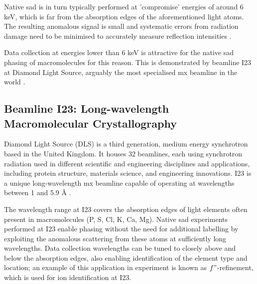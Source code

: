 Native \ac{sad} is in turn typically performed at 'compromise' energies of around 6 \unit{keV}, which is far from the absorption edges of the aforementioned light atoms. The resulting anomalous signal is small and systematic errors from radiation damage need to be minimised to accurately measure reflection intensities \cite{DjinovicCarugo2005}.%

Data collection at energies lower than 6 \unit{keV} is attractive for the native \ac{sad} phasing of macromolecules for this reason. This is demonstrated %
by beamline I23 at Diamond Light Source, arguably the most specialised \ac{mx} beamline in the world \cite{Foerster2019}. %

\subsection{Beamline I23: Long-wavelength Macromolecular Crystallography}

Diamond Light Source (DLS) is a third generation, medium energy synchrotron based in the United Kingdom. It houses 32 beamlines, each using synchrotron radiation used in different scientific and engineering disciplines and applications, including protein structure, materials science, and engineering innovations.
I23 is a unique long-wavelength \ac{mx} beamline capable of operating at wavelengths between 1 and 5.9 Å \cite{Wagner2016}.

The wavelength range at I23 covers the absorption edges of
light elements often present in macromolecules (P, S, Cl, K, Ca, Mg).
Native \ac{sad} experiments performed at I23 enable phasing without the need for additional labelling by exploiting the anomalous scattering from these atoms at sufficiently long wavelengths.
Data collection wavelengths can be tuned to closely above and below the absorption edges, also enabling identification of the element type and location; an example of this application in experiment is known as $f"$-refinement, which is used for ion identification at I23. %

